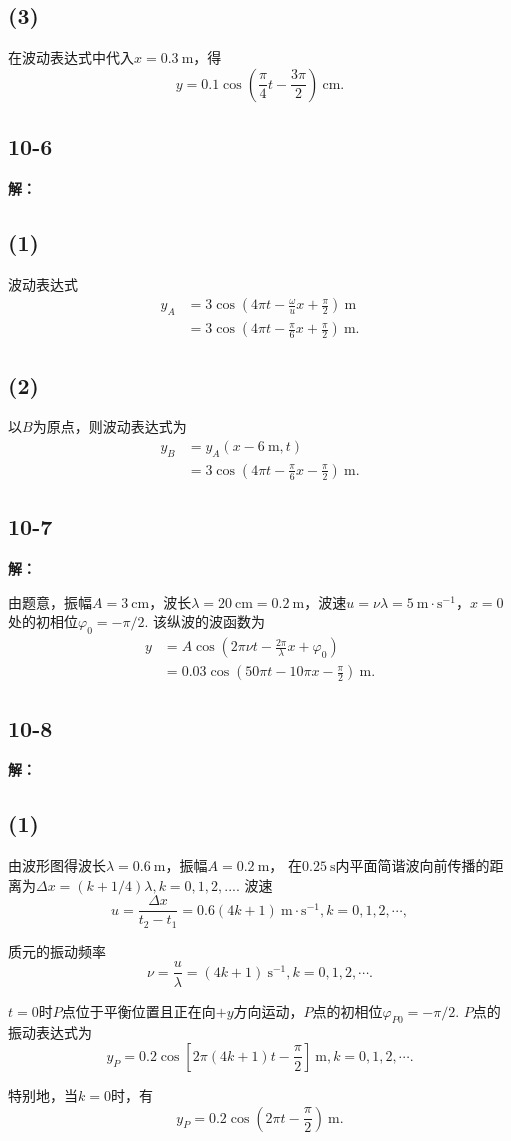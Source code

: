 \documentclass[twocolumn]{ctexart}
\newcommand{\sol}[1]{\subsection*{#1}\noindent\textbf{解：}
	
}
\newcommand{\un}[1]{\ \mathrm{#1}}
\begin{document}
\subsection*{(3)}
在波动表达式中代入$x=0.3\un m$，得
$$y=0.1\cos\left(\frac{\pi}{4}t-\frac{3\pi}{2}\right)\un{cm}.$$

\sol{10-6}
\subsection*{(1)}
波动表达式
\begin{align*}
	y_A&=3\cos\left(4\pi t-\frac{\omega}{u}x+\frac{\pi}{2}\right)\un m\\
	&=3\cos\left(4\pi t-\frac{\pi}{6}x+\frac{\pi}{2}\right)\un m.
\end{align*}

\subsection*{(2)}
以$B$为原点，则波动表达式为
\begin{align*}
	y_B&=y_A(x-6\un m,t)\\
	&=3\cos\left(4\pi t-\frac{\pi}{6}x-\frac{\pi}{2}\right)\un m.
\end{align*}

\sol{10-7}
由题意，振幅$A=3\un{cm}$，波长$\lambda=20\un{cm}=0.2\un{m}$，波速$u=\nu\lambda=5\un{m\cdot s^{-1}}$，$x=0$处的初相位$\varphi_0=-\pi/2$. 该纵波的波函数为
\begin{align*}
	y&=A\cos\left(2\pi\nu t-\frac{2\pi}{\lambda}x+\varphi_0\right)\\
	&=0.03\cos\left(50\pi t-10\pi x-\frac{\pi}{2}\right)\un{m}.
\end{align*}

\sol{10-8}
\subsection*{(1)}
由波形图得波长$\lambda=0.6\un m$，振幅$A=0.2\un m$， 在$0.25\un s$内平面简谐波向前传播的距离为$\Delta x=\left(k+1/4\right)\lambda, k=0,1,2,...$. 波速
$$u=\frac{\Delta x}{t_2-t_1}=0.6(4k+1)\un{m\cdot s^{-1}},k=0,1,2,\cdots,$$

质元的振动频率
$$\nu=\frac{u}{\lambda}=(4k+1)\un{s^{-1}},k=0,1,2,\cdots.$$

$t=0$时$P$点位于平衡位置且正在向$+y$方向运动，$P$点的初相位$\varphi_{P0}=-\pi/2$. $P$点的振动表达式为
$$y_P=0.2\cos\left[2\pi(4k+1)t-\frac{\pi}{2}\right]\un m,k=0,1,2,\cdots.$$

特别地，当$k=0$时，有
$$y_P=0.2\cos\left(2\pi t-\frac{\pi}{2}\right)\un m.$$
\end{document}
